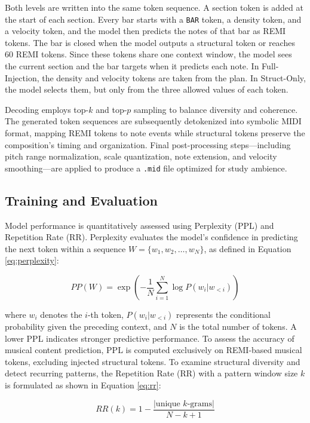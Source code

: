 \documentclass[conference,a4paper]{IEEEtran}
\begin{document}
Both levels are written into the same token sequence. A section token is added at the start of each section. Every bar starts with a \texttt{BAR} token, a density token, and a velocity token, and the model then predicts the notes of that bar as REMI tokens. The bar is closed when the model outputs a structural token or reaches 60 REMI tokens. Since these tokens share one context window, the model sees the current section and the bar targets when it predicts each note. In Full-Injection, the density and velocity tokens are taken from the plan. In Struct-Only, the model selects them, but only from the three allowed values of each token.

Decoding employs top-$k$ and top-$p$ sampling to balance diversity and coherence. The generated token sequences are subsequently detokenized into symbolic MIDI format, mapping REMI tokens to note events while structural tokens preserve the composition’s timing and organization. Final post-processing steps—including pitch range normalization, scale quantization, note extension, and velocity smoothing—are applied to produce a \texttt{.mid} file optimized for study ambience.

\subsection{Training and Evaluation}

Model performance is quantitatively assessed using Perplexity (PPL) and Repetition Rate (RR). Perplexity evaluates the model’s confidence in predicting the next token within a sequence $W=\{w_1,w_2,\dots,w_N\}$, as defined in Equation \ref{eq:perplexity}:


\begin{equation}
PP(W)=\exp\left(-\frac{1}{N}\sum_{i=1}^{N}\log P(w_i|w_{<i})\right)
\label{eq:perplexity}
\end{equation}

\noindent where $w_i$ denotes the $i$-th token, $P(w_i|w_{<i})$ represents the conditional probability given the preceding context, and $N$ is the total number of tokens. A lower PPL indicates stronger predictive performance. To assess the accuracy of musical content prediction, PPL is computed exclusively on REMI-based musical tokens, excluding injected structural tokens. To examine structural diversity and detect recurring patterns, the Repetition Rate (RR) with a pattern window size $k$ is formulated as shown in Equation \ref{eq:rr}:

\begin{equation}
RR(k)=1-\frac{|\text{unique }k\text{-grams}|}{N-k+1}
\label{eq:rr}
\end{equation}
\end{document}
